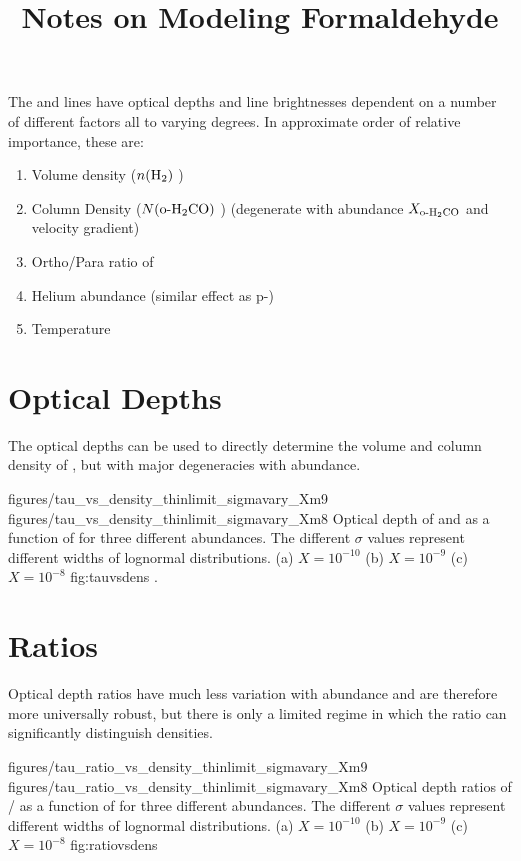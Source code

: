 
\title{Notes on Modeling Formaldehyde}

The \ortho \oneone and \twotwo lines have optical depths and line
brightnesses dependent on a number of different factors all to varying degrees.
In approximate order of relative importance, these are:

\begin{enumerate}
    \item Volume density ($n(\textrm{H}_{2})$ \percc)
    \item Column Density ($N(\textrm{o-H}_2\textrm{CO})$ \persc) \perkms
          (degenerate with abundance $X_{\textrm{o-H}_2\textrm{CO}}$ and velocity gradient)
    \item Ortho/Para ratio of \hh
    \item Helium abundance (similar effect as p-\hh)
    \item Temperature
\end{enumerate}


\section{Optical Depths}
The optical depths can be used to directly determine the volume and column
density of \ortho, but with major degeneracies with abundance.

               {figures/tau_vs_density_thinlimit_sigmavary_Xm9}
               {figures/tau_vs_density_thinlimit_sigmavary_Xm8}
{Optical depth of \ortho \oneone and \twotwo as a function of \dens for three
different abundances.  The different $\sigma$ values represent different widths
of lognormal distributions.
(a) $X=10^{-10}$ (b) $X=10^{-9}$ (c) $X=10^{-8}$
}
{fig:tauvsdens}
.

\section{Ratios}
Optical depth ratios have much less variation with abundance and are therefore more universally
robust, but there is only a limited regime in which the ratio can significantly distinguish densities.

               {figures/tau_ratio_vs_density_thinlimit_sigmavary_Xm9}
               {figures/tau_ratio_vs_density_thinlimit_sigmavary_Xm8}
{Optical depth ratios of \ortho \oneone / \twotwo as a function of \dens for three
different abundances.  The different $\sigma$ values represent different widths
of lognormal distributions.
(a) $X=10^{-10}$ (b) $X=10^{-9}$ (c) $X=10^{-8}$ }
{fig:ratiovsdens}


